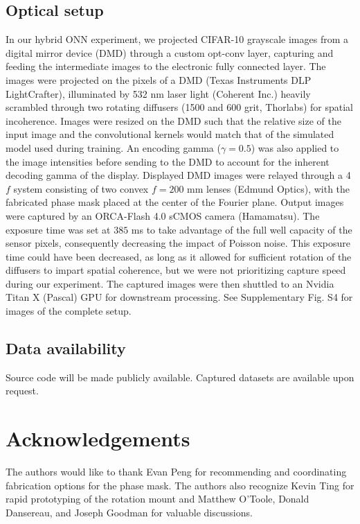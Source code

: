 \documentclass[fleqn,10pt]{wlscirep}
\begin{document}
\subsection*{Optical setup}
In our hybrid ONN experiment, we projected CIFAR-10 grayscale images from a digital mirror device (DMD) through a custom opt-conv layer, capturing and feeding the intermediate images to the electronic fully connected layer. The images were projected on the pixels of a DMD (Texas Instruments DLP LightCrafter), illuminated by 532 nm laser light (Coherent Inc.) heavily scrambled through two rotating diffusers (1500 and 600 grit, Thorlabs) for spatial incoherence. Images were resized on the DMD such that the relative size of the input image and the convolutional kernels would match that of the simulated model used during training. An encoding gamma ($\gamma = 0.5$) was also applied to the image intensities before sending to the DMD to account for the inherent decoding gamma of the display. Displayed DMD images were relayed through a 4$f$ system consisting of two convex $f = 200$ mm lenses (Edmund Optics), with the fabricated phase mask placed at the center of the Fourier plane. Output images were captured by an ORCA-Flash 4.0 sCMOS camera (Hamamatsu). The exposure time was set at $385$ ms to take advantage of the full well capacity of the sensor pixels, consequently decreasing the impact of Poisson noise. This exposure time could have been decreased, as long as it allowed for sufficient rotation of the diffusers to impart spatial coherence, but we were not prioritizing capture speed during our experiment. The captured images were then shuttled to an Nvidia Titan X (Pascal) GPU for downstream processing. See Supplementary Fig. S4 for images of the complete setup. 

\subsection*{Data availability}
Source code will be made publicly available. Captured datasets are available upon request.




\section*{Acknowledgements}
The authors would like to thank Evan Peng for recommending and coordinating fabrication options for the phase mask. The authors also recognize Kevin Ting for rapid prototyping of the rotation mount and Matthew O’Toole, Donald Dansereau, and Joseph Goodman for valuable discussions.
\end{document}

